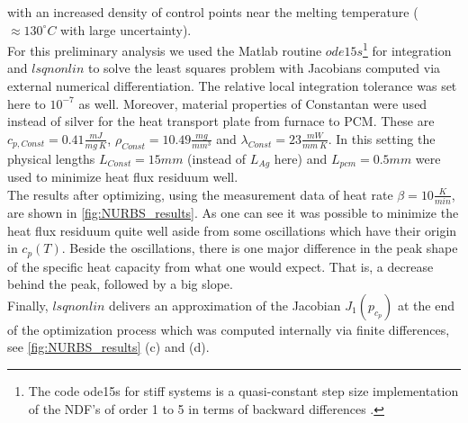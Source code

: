\documentclass{scrartcl}[12pt, halfparskip]
\numberwithin{equation}{section}
\numberwithin{figure}{section}
\numberwithin{table}{section}
\begin{document}
with an increased density of control points near the melting temperature ($\approx 130^{\circ}C$ with large uncertainty). \\
For this preliminary analysis we used the Matlab routine $ode15s$\footnote{The code ode15s for stiff systems is a quasi-constant step size implementation of the NDF’s of order 1 to 5 in terms of backward differences \cite{matlab_ode_suite}.} for integration and $lsqnonlin$ to solve the least squares problem with Jacobians computed via external numerical differentiation. 
The relative local integration tolerance was set here to $10^{-7}$ as well. Moreover, material properties of Constantan were used instead of silver for the heat transport plate from furnace to PCM. These are $c_{p,Const}=0.41\frac{mJ}{mg \ K}$, $\rho_{Const}=10.49\frac{mg}{mm^3}$ and $\lambda_{Const}=23\frac{mW}{mm \ K}$. 
In this setting the physical lengths $L_{Const}=15mm$ (instead of $L_{Ag}$ here) and $L_{pcm}=0.5mm$ were used to minimize heat flux residuum well. \\
The results after optimizing, using the measurement data of heat rate $\beta = 10 \frac{K}{min}$, are shown in \cref{fig:NURBS_results}. As one can see it was possible to minimize the heat flux residuum quite well aside from some oscillations which have their origin in $c_p(T)$. 
Beside the oscillations, there is one major difference in the peak shape of the specific heat capacity from what one would expect. That is, a decrease behind the peak, followed by a big slope. \\

Finally, $lsqnonlin$ delivers an approximation of the Jacobian $J_1(p_{c_p})$ at the end of the optimization process which was computed internally via finite differences, see \cref{fig:NURBS_results} (c) and (d). 
\end{document}
